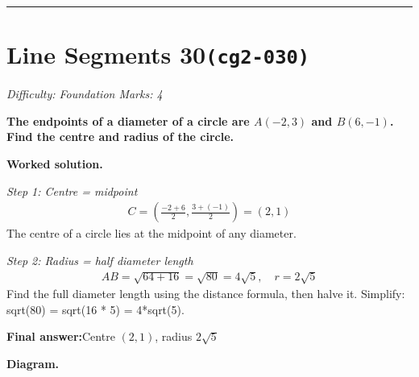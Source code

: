 \documentclass[11pt]{article}
\newcommand{\question}[1]{\par\medskip\noindent\textbf{#1}\par}
\begin{document}
\medskip\hrule

\section*{Line Segments 30\quad\small\texttt{(cg2-030)}}
\textit{Difficulty: Foundation \quad\textbar\quad Marks: 4}

\question{The endpoints of a diameter of a circle are \( A(-2, 3) \) and \( B(6, -1) \). Find the centre and radius of the circle.}

\textbf{Worked solution.}

\textit{Step 1: Centre = midpoint}
\[\begin{gathered}
C = \left(\frac{-2+6}{2}, \frac{3+(-1)}{2}\right) = (2, 1)
\end{gathered}\]
The centre of a circle lies at the midpoint of any diameter.

\textit{Step 2: Radius = half diameter length}
\[\begin{gathered}
AB = \sqrt{64+16} = \sqrt{80} = 4\sqrt{5}, \quad r = 2\sqrt{5}
\end{gathered}\]
Find the full diameter length using the distance formula, then halve it. Simplify: sqrt(80) = sqrt(16 * 5) = 4*sqrt(5).

\begin{answerbox}
\textbf{Final answer:}\quad Centre \(\displaystyle (2, 1)\), radius \(\displaystyle 2\sqrt{5}\)
\end{answerbox}
\textbf{Diagram.}
\end{document}
